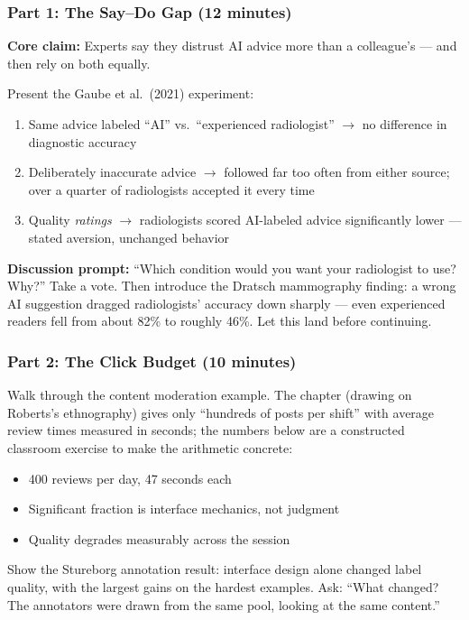 \subsubsection{Part 1: The Say--Do Gap (12 minutes)}

\textbf{Core claim:} Experts say they distrust AI advice more than a colleague's --- and then rely on both equally.

Present the Gaube et al.\ (2021) experiment:
\begin{enumerate}
    \item Same advice labeled ``AI'' vs.\ ``experienced radiologist'' $\to$ no difference in diagnostic accuracy
    \item Deliberately inaccurate advice $\to$ followed far too often from either source; over a quarter of radiologists accepted it every time
    \item Quality \emph{ratings} $\to$ radiologists scored AI-labeled advice significantly lower --- stated aversion, unchanged behavior
\end{enumerate}

\begin{trythis}
\textbf{Discussion prompt:} ``Which condition would you want your radiologist to use? Why?'' Take a vote. Then introduce the Dratsch mammography finding: a wrong AI suggestion dragged radiologists' accuracy down sharply --- even experienced readers fell from about 82\% to roughly 46\%. Let this land before continuing.
\end{trythis}

\subsubsection{Part 2: The Click Budget (10 minutes)}

Walk through the content moderation example. The chapter (drawing on Roberts's ethnography) gives only ``hundreds of posts per shift'' with average review times measured in seconds; the numbers below are a constructed classroom exercise to make the arithmetic concrete:
\begin{itemize}
    \item 400 reviews per day, 47 seconds each
    \item Significant fraction is interface mechanics, not judgment
    \item Quality degrades measurably across the session
\end{itemize}

Show the Stureborg annotation result: interface design alone changed label quality, with the largest gains on the hardest examples. Ask: ``What changed? The annotators were drawn from the same pool, looking at the same content.''

